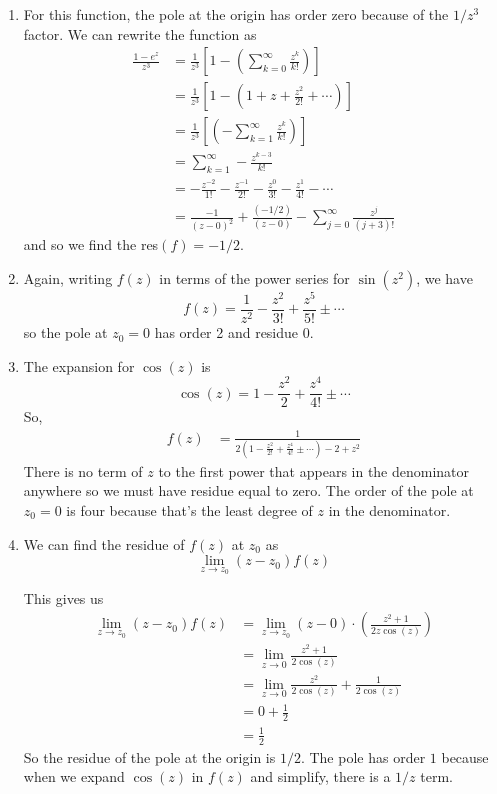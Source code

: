 \documentclass{article}
\begin{document}
\begin{enumerate}[label=(\alph*)]
  \item For this function, the pole at the origin has order zero because of the $1/z^3$ factor. We can rewrite the function as 
  \begin{align*}
    \frac{1 - e^{z}}{z^3} &= \frac{1}{z^3} \left[ 1 - \left(\sum_{k = 0}^{\infty} \frac{z^k}{k!} \right) \right] \\
    &= \frac{1}{z^3} \left[ 1 - \left(1 + z + \frac{z^2}{2!} + \cdots \right) \right] \\
    &= \frac{1}{z^3} \left[\left( - \sum_{k = 1}^{\infty} \frac{z^k}{k!} \right)\right] \\
    &= \sum_{k = 1}^{\infty} -\frac{z^{k-3}}{k!} \\
    &= -\frac{z^{-2}}{1!} -\frac{z^{-1}}{2!} -\frac{z^0}{3!} - \frac{z^{1}}{4!} - \cdots \\
    &= \frac{-1}{(z-0)^2} + \frac{(-1/2)}{(z-0)} - \sum_{j = 0}^{\infty} \frac{z^{j}}{(j+3)!}
  \end{align*}
  and so we find the res$(f) = -1/2$.

  \item Again, writing $f(z)$ in terms of the power series for $\sin(z^2)$, we have 
  \[ f(z) = \frac{1}{z^2} - \frac{z^2}{3!} + \frac{z^5}{5!} \pm \cdots \] so the pole at $z_0 = 0$ has order 2 and residue 0.

  \item The expansion for $\cos(z)$ is 
  \[ \cos(z) = 1 - \frac{z^2}{2} + \frac{z^4}{4!} \pm \cdots  \]
  So, 
  \begin{align*}
    f(z) &= \frac{1}{2 \left(1 - \frac{z^2}{2!} + \frac{z^4}{4!} \pm \cdots \right) - 2 + z^2}
  \end{align*}
  There is no term of $z$ to the first power that appears in the denominator anywhere so we must have residue equal to zero. The order of the pole at $z_0 = 0$ is four because that's the least degree of $z$ in the denominator.

  \item We can find the residue of $f(z)$ at $z_0$ as 
  \[  \lim_{z \rightarrow z_0} \left(z - z_0\right)f(z) \]

  This gives us 
  \begin{align*}
    \lim_{z \rightarrow z_0} \left(z - z_0\right)f(z) &=  \lim_{z \rightarrow z_0} \left(z - 0\right) \cdot \left( \frac{z^2+1}{2z \cos(z)} \right) \\
    &= \lim_{z \rightarrow 0} \frac{z^2 + 1}{2\cos(z)} \\
    &= \lim_{z \rightarrow 0} \frac{z^2 }{2\cos(z)} +  \frac{1}{2\cos(z)} \\
    &= 0 + \frac{1}{2} \\
    &= \frac{1}{2}
  \end{align*}
  So the residue of the pole at the origin is $1/2$. The pole has order $1$ because when we expand $\cos(z)$ in $f(z)$ and simplify, there is a $1/z$ term.
\end{enumerate}
\end{document}
